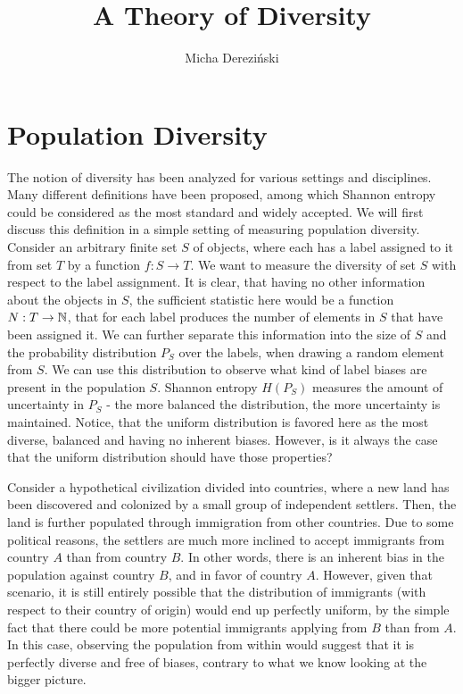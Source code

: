 \documentclass{article} %
\title{A Theory of Diversity}
\author{Micha{\polishl} Derezi\'{n}ski}
\begin{document}
\maketitle

\section{Population Diversity}
\label{sec:population-diversity}
The notion of diversity has been analyzed for various settings and
disciplines. Many different definitions have been proposed, among
which Shannon entropy could be considered as the most standard and widely
accepted. We will first discuss this definition in a simple setting of
measuring population diversity. Consider an arbitrary finite set $S$ of
objects, where each has a label assigned to it from set $T$ by a function
$f:S\rightarrow T$. We want to measure the diversity of set $S$ with
respect to the label assignment. It is clear, that having no other
information about the objects in $S$, the sufficient statistic here
would be a function $N:T\rightarrow {\mathbb N}$, that for each label produces
the number of elements in $S$ that have been assigned it. We can
further separate this information into the size of $S$ and the
probability distribution $P_S$ over the labels, when drawing a random
element from $S$. We can use this distribution to observe what kind of
label biases are present in the population $S$. Shannon entropy
$H(P_S)$ measures the amount of uncertainty in $P_S$ - the more
balanced the distribution, the more uncertainty 
is maintained. Notice, that the uniform distribution is favored here as
the most diverse, balanced and having no inherent biases. However, is
it always the case that the uniform distribution should have those
properties? 

Consider a hypothetical civilization divided into countries, where a
new land has been discovered and colonized by a small group of
independent settlers. Then, the land is further populated through
immigration from other countries. Due to some political reasons, the
settlers are much more inclined to accept immigrants from country $A$
than from country $B$. In other words, there is an inherent bias in
the population against country $B$, and in favor of country
$A$. However, given that scenario, it is still entirely possible that
the distribution of immigrants (with respect to their country of
origin) would end up perfectly uniform, by the simple fact that there
could be more potential immigrants applying from $B$ than from $A$. In
this case, observing the population from within would suggest that it
is perfectly diverse and free of biases, contrary to what we know
looking at the bigger picture. 
\end{document}

